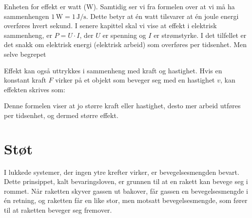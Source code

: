 
Enheten for effekt er watt (W). Samtidig ser vi fra formelen over at vi må ha sammenhengen \( 1 \, \text{W} = 1 \, \text{J/s} \). Dette betyr at én watt tilsvarer at én joule energi overføres hvert sekund. I senere kapittel skal vi vise at effekt i elektrisk sammenheng, er $P=U\cdot I$, der $U$ er spenning og $I$ er strømstyrke. I det tilfellet er det snakk om elektrisk energi (elektrisk arbeid) som overføres per tidsenhet. Men selve begrepet 

Effekt kan også uttrykkes i sammenheng med kraft og hastighet. Hvis en konstant kraft \( F \) virker på et objekt som beveger seg med en hastighet \( v \), kan effekten skrives som:


Denne formelen viser at jo større kraft eller hastighet, desto mer arbeid utføres per tidsenhet, og dermed større effekt.




\section{Støt}
I lukkede systemer, der ingen ytre krefter virker, er bevegelsesmengden bevart. Dette prinsippet, kalt bevaringsloven, er grunnen til at en rakett kan bevege seg i rommet. Når raketten skyver gassen ut bakover, får gassen en bevegelsesmengde i én retning, og raketten får en like stor, men motsatt bevegelsesmengde, som fører til at raketten beveger seg fremover.


